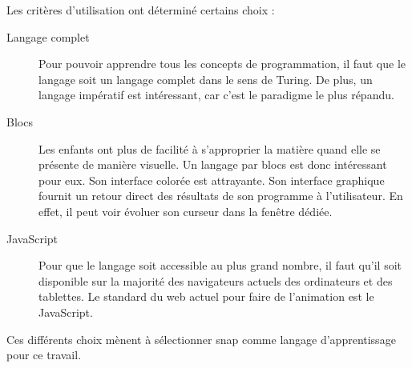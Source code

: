 Les critères d'utilisation ont déterminé certains choix :
\begin{description}
  \item[Langage complet] Pour pouvoir apprendre tous les concepts de programmation, il faut que le langage soit un langage complet dans le sens de Turing.  De plus, un langage impératif est intéressant, car c'est le paradigme le plus répandu.
  \item[Blocs] Les enfants ont plus de facilité à s'approprier la matière quand elle se présente de manière visuelle. %
  Un langage par \glspl{bloc} est donc intéressant pour eux. Son interface colorée est attrayante. Son interface graphique fournit un retour direct des résultats de son programme à l'utilisateur. En effet, il peut voir évoluer son curseur dans la fenêtre dédiée.
  \item[JavaScript] Pour que le langage soit accessible au plus grand nombre, il faut qu'il soit disponible sur la majorité des navigateurs actuels des ordinateurs et des tablettes. Le standard du web actuel pour faire de l'animation est le JavaScript.
\end{description}
Ces différents choix mènent à sélectionner \gls{snap} comme langage d'apprentissage pour ce travail.
